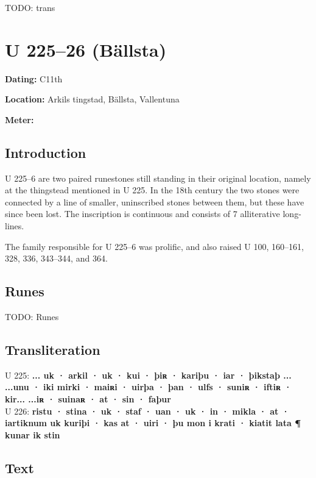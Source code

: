 \bpb TODO: trans\epb\epg

\sectionline\clearpage


\section{U 225--26 (Bällsta)}

\begin{flushright}%
\textbf{Dating:} C11th

\textbf{Location:} Arkils tingstad, Bällsta, Vallentuna

\textbf{Meter:} \Fornyrdislag
\end{flushright}%

\subsection{Introduction}

U 225--6 are two paired runestones still standing in their original location, namely at the thingstead mentioned in U 225.  In the 18th century the two stones were connected by a line of smaller, uninscribed stones between them, but these have since been lost.  The inscription is continuous and consists of 7 alliterative long-lines.

The family responsible for U 225--6 was prolific, and also raised U 100, 160--161, 328, 336, 343--344, and 364.

\subsection{Runes}

TODO: Runes%

\subsection{Transliteration}

U 225: \textbf{... uk · arkil · uk · kui · þiʀ · kariþu · iar · þikstaþ ... ...unu · iki mirki · maiʀi · uirþa · þan · ulfs · suniʀ · iftiʀ · kir... ...iʀ · suinaʀ · at · sin · faþur} \\
U 226: \textbf{ristu · stina · uk · staf · uan · uk · in · mikla · at · iartiknum uk kuriþi · kas at · uiri · þu mon i krati · kiatit lata ¶ kunar ik stin}

\subsection{Text}

